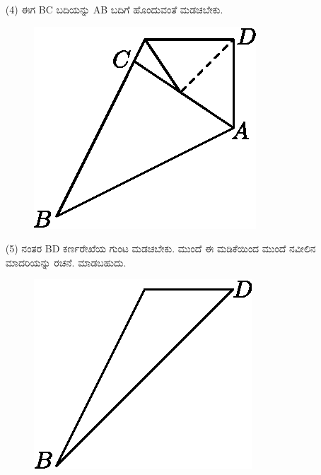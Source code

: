 \begin{itemize}
\item[(4)] ಈಗ BC ಬದಿಯನ್ನು AB ಬದಿಗೆ ಹೊಂದುವಂತೆ ಮಡಚಬೇಕು. 
\begin{figure}[H]
\centering
\includegraphics[scale=.98]{src/figure/chap1/fig1-10d.eps}
\end{figure}

\item[(5)] ನಂತರ BD ಕರ್ಣರೇಖೆಯ ಗುಂಟ ಮಡಚಬೇಕು. ಮುಂದೆ ಈ ಮಡಿಕೆಯಿಂದ ಮುಂದೆ ನವೀಲಿನ ಮಾದರಿಯನ್ನು ರಚನೆ. ಮಾಡಬಹುದು. 
\begin{figure}[H]
\centering
\includegraphics[scale=.98]{src/figure/chap1/fig1-10e.eps}
\end{figure}


\end{itemize}
